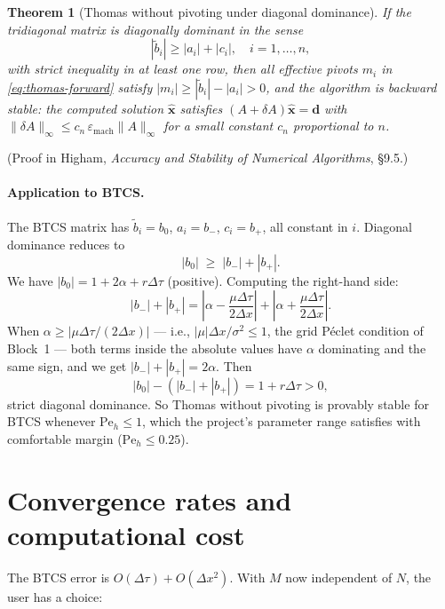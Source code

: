 \documentclass[11pt,a4paper]{article}
\newtheorem{theorem}[proposition]{Theorem}
\begin{document}
\begin{theorem}[Thomas without pivoting under diagonal dominance]
\label{thm:thomas-stab}
If the tridiagonal matrix is diagonally dominant in the sense
\begin{equation}
|\tilde b_i| \ge |a_i| + |c_i|, \quad i = 1, \dots, n,
\label{eq:diag-dominance}
\end{equation}
with strict inequality in at least one row, then all effective
pivots $m_i$ in \eqref{eq:thomas-forward} satisfy $|m_i| \ge
|\tilde b_i| - |a_i| > 0$, and the algorithm is backward stable:
the computed solution $\hat{\mathbf{x}}$ satisfies
$(A + \delta A)\hat{\mathbf{x}} = \mathbf{d}$ with
$\|\delta A\|_\infty \le c_n\,\varepsilon_{\mathrm{mach}}\|A\|_\infty$
for a small constant $c_n$ proportional to $n$.
\end{theorem}

(Proof in Higham, \emph{Accuracy and Stability of Numerical Algorithms},
\S9.5.)

\paragraph{Application to BTCS.} The BTCS matrix has $\tilde b_i =
b_0$, $a_i = b_-$, $c_i = b_+$, all constant in $i$. Diagonal
dominance reduces to
\[
|b_0| \;\ge\; |b_-| + |b_+|.
\]
We have $|b_0| = 1 + 2\alpha + r\Delta\tau$ (positive). Computing the
right-hand side:
\[
|b_-| + |b_+|
= \left|\alpha - \frac{\mu\Delta\tau}{2\Delta x}\right|
 + \left|\alpha + \frac{\mu\Delta\tau}{2\Delta x}\right|.
\]
When $\alpha \ge \bigl|\mu\Delta\tau/(2\Delta x)\bigr|$ — i.e.,
$\bigl|\mu\bigr|\Delta x/\sigma^2 \le 1$, the grid Péclet condition
of Block~1 — both terms inside the absolute values have $\alpha$
dominating and the same sign, and we get
$|b_-| + |b_+| = 2\alpha$. Then
\[
|b_0| - (|b_-| + |b_+|) = 1 + r\Delta\tau > 0,
\]
strict diagonal dominance. So Thomas without pivoting is provably
stable for BTCS whenever $\mathrm{Pe}_h \le 1$, which the project's
parameter range satisfies with comfortable margin
($\mathrm{Pe}_h \le 0.25$).

\section{Convergence rates and computational cost}

The BTCS error is $O(\Delta\tau) + O(\Delta x^2)$. With $M$ now
independent of $N$, the user has a choice:
\end{document}
